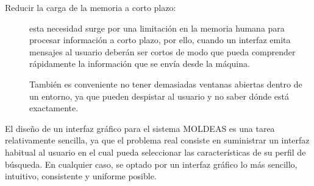 \begin{description}
\item[Reducir la carga de la memoria a corto plazo:] esta necesidad surge por
una limitación en la memoria humana para procesar información a corto plazo, por ello, cuando 
un interfaz emita mensajes al usuario deberán ser cortos de modo que pueda comprender 
rápidamente la información que se envía desde la máquina.

También es conveniente no tener demasiadas ventanas abiertas dentro de un entorno, 
ya que pueden despistar al usuario y no saber dónde está exactamente.

\end{description}

El diseño de un interfaz gráfico para el sistema MOLDEAS es una tarea relativamente
sencilla, ya que el problema real consiste en suministrar un interfaz habitual 
al usuario en el cual pueda seleccionar las características de su perfil 
de búsqueda. En cualquier caso, se optado por un interfaz gráfico 
lo más sencillo, intuitivo, consistente y uniforme posible.








